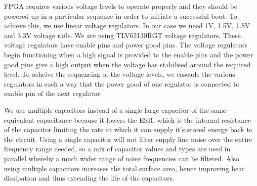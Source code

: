 \documentclass[../../main.tex]{subfiles}
\begin{document}
FPGA requires various voltage levels to operate properly and they should be powered up in a particular sequence in order to initiate a successful boot. To achieve this, we use linear voltage regulators. In our case we need 1V, 1.5V, 1.8V and 3.3V voltage rails. We are using TLV62130RGT voltage regulators. These voltage regulators have enable pins and power good pins. The voltage regulators begin functioning when a high signal is provided to the enable pins and the power good pins give a high output when the voltage has stabilised around the required level. To acheive the sequencing of the voltage levels, we cascade the various regulators in such a way that the power good of one regulator is connected to enable pin of the next regulator. 

We use multiple capacitors instead of a single large capacitor of the same equivalent capacitance because it lowers the ESR, which is the internal resistance of the capacitor limiting the rate at which it can supply it's stored energy back to the circuit. Using a single capacitor will not filter supply line noise over the entire frequency range needed, so a mix of capacitor values and types are used in parallel whereby a much wider range of noise frequencies can be filtered. Also using multiple capacitors increases the total surface area, hence improving heat dissipation and thus extending the life of the capacitors.
\end{document}
